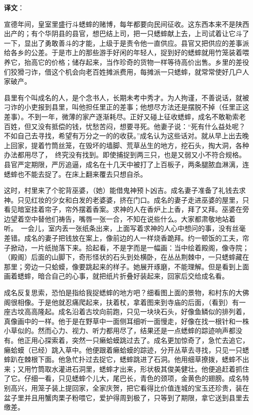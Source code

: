 \documentclass[12pt,UTF-8,openany,a4]{ctexbook}
\begin{document}
\newpage

\begin{Large}
   \noindent \textbf{译文}：
\end{Large}

\vspace{1em}

\begin{large}\yiwen
    
    宣德年间，皇室里盛行斗蟋蟀的赌博，每年都要向民间征收。这东西本来不是陕西出产的；有个华阴县的县官，想巴结上司，把一只蟋蟀献上去，上司试着让它斗了一下，显出了勇敢善斗的才能，上级于是责令他一直供应。县官又把供应的差事派给各乡的公差。于是市上的那些游手好闲的年轻人，捉到好的蟋蟀就用竹笼装着喂养它，抬高它的价格；储存起来，当作珍奇的货物一样等待高价出售。乡里的差役们狡猾刁诈，借这个机会向老百姓摊派费用，每摊派一只蟋蟀，就常常使好几户人家破产。
    
    县里有个叫成名的人，是个念书人，长期未考中秀才。为人拘谨，不善说话，就被刁诈的小吏报到县里，叫他担任里正的差事；他想尽方法还是摆脱不掉（任里正这差事）。不到一年，微薄的家产逐渐耗尽。正好又碰上征收蟋蟀，成名不敢勒索老百姓，但又没有抵偿的钱，忧愁苦闷，想要寻死。他妻子说：“死有什么益处呢？不如自己去寻找，希望有万分之一的的收获。”成名认为这些话对。就从早上出去晚上回家，提着竹筒丝笼，在毁坏的墙脚、荒草丛生的地方，挖石头，掏大洞，各种办法都用尽了， 终究没有找到。即使捕捉到两三只，也是又弱又小不符合规格。县官严定期限，严厉追逼，成名在十几天中被打了上百板子，两条腿脓血淋漓，连蟋蟀也不能去捉了。在床上翻来覆去只想自杀。
    
    这时，村里来了个驼背巫婆，（她）能借鬼神预卜凶吉。成名妻子准备了礼钱去求神。只见红妆的少女和白发的老婆婆，挤在门口。成名的妻子走进巫婆的屋里，只看见暗室挂着帘子，帘外摆着香案。求神的人在香炉上上香，拜了又拜。巫婆在旁边望着空中替他们祷告，嘴唇一张一合，不知在说些什么。大家都肃敬地站着听。 一会儿，室内丢一张纸条出来，上面写着求神的人心中想问的事，没有丝毫差错。成名的妻子把钱放在案上，像前边的人一样烧香跪拜。约一顿饭的工夫，帘子掀动，一片纸抛落下来。拾起看，不是字而是一幅画：当中绘着殿阁，像寺院；（殿阁）后面的山脚下，奇形怪状的石头到处横卧，在丛丛荆棘中，一只蟋蟀藏在那里；旁边一只蛤蟆，像要跳起来的样子。她展开琢磨，不能理解。但是看到上面画着蟋蟀，暗合自己的心事，就把纸片折叠好装起来，回家后交给成名看。
    
    成名反复思索，恐怕是指给我捉蟋蟀的地方吧？细看图上面的景物，和村东的大佛阁很相像。于是他就忍痛爬起来，扶着杖，拿着图来到寺庙的后面，（看到）有一座古坟高高隆起。成名沿着古坟向前跑，只见一块块石头，好像鱼鳞似的排列着，真像画中的一样。他于是在野草中一面侧耳细听一面慢走，好像在找一根针和一株小草似的。然而心力、视力、听力都用尽了，结果还是一点蟋蟀的踪迹响声都没有。他正用心探索着，突然一只癞蛤蟆跳过去了。成名更加惊奇了，急忙去追它，癞蛤蟆（已经）跳入草中。他便跟着癞蛤蟆的踪迹，分开丛草去寻找，只见一只蟋蟀趴在棘根下面。他急忙扑过去捉它，蟋蟀跳进了石洞。他用细草撩拨，蟋蟀不出来；又用竹筒取水灌进石洞里，蟋蟀才出来，形状极其俊美健壮。他便追赶着抓住了它。仔细一看，只见蟋蟀个儿大，尾巴长，青色的颈项，金黄色的翅膀。成名特别高兴，用笼子装上提回家，全家庆贺，把它看得比价值连城的宝玉还珍贵，装在盆子里并且用蟹肉栗子粉喂它，爱护得周到极了，只等到了期限，拿它送到县里去缴差。
    

\end{large}
\end{document}
